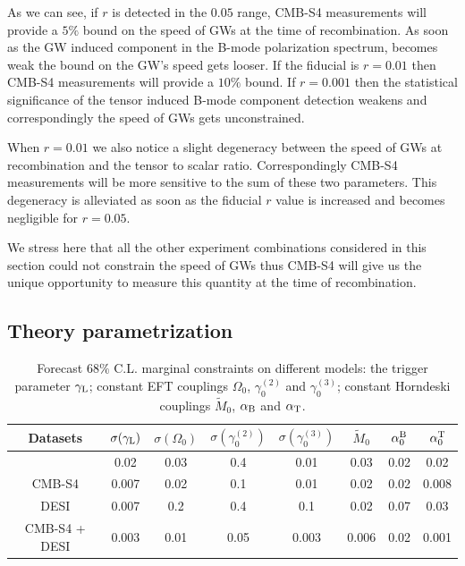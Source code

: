 As we can see, if $r$ is detected in the $0.05$ range, CMB-S4 measurements will provide a $5\%$ bound on the speed of GWs at the time of recombination.
As soon as the GW induced component in the B-mode polarization spectrum, becomes weak the bound on the GW's speed gets looser. If the fiducial is $r=0.01$ then CMB-S4 measurements will provide a $10\%$ bound. If $r=0.001$ then the statistical significance of the tensor induced B-mode component detection weakens and correspondingly the speed of GWs gets unconstrained.

When $r=0.01$ we also notice a slight degeneracy between the speed of GWs at recombination and the tensor to scalar ratio. Correspondingly CMB-S4 measurements will be more sensitive to the sum of these two parameters. This degeneracy is alleviated as soon as the fiducial $r$ value is increased and becomes negligible for $r=0.05$.

We stress here that all the other experiment combinations considered in this section could not constrain the speed of GWs thus CMB-S4 will give us the unique opportunity to measure this quantity at the time of recombination.

\subsection{Theory parametrization}

\begin{table}[t!]
\begin{center}
\begin{tabular}{|c||c||c|c|c||c|c|c|} 
\hline
Datasets 			& $\sigma ( \gamma_{\rm L} )$  & $\sigma ( \Omega_0 )$ & $\sigma ( \gamma_0^{(2)} )$ & $\sigma ( \gamma_0^{(3)} ) $ & $\tilde{M}_0$ & $\alpha_0^{\rm B}$ & $\alpha_0^{\rm T}$    \\
\hline
\hline
\planck  		& 0.02 & 0.03 & 0.4 & 0.01 & 0.03 & 0.02 & 0.02 \\
\hline
CMB-S4       & 0.007 & 0.02 & 0.1 & 0.01 & 0.02 & 0.02 & 0.008 \\
\hline
DESI            & 0.007 & 0.2 & 0.4 & 0.1 & 0.02 & 0.07 & 0.03 \\
\hline
CMB-S4 + DESI  & 0.003 & 0.01 & 0.05 & 0.003 & 0.006 & 0.02 & 0.001 \\
\hline
\end{tabular}
\caption{Forecast $68\%$ C.L. marginal constraints on different models: the trigger parameter $\gamma_{\rm L}$; constant EFT couplings $\Omega_0$, $\gamma_0^{(2)}$ and $\gamma_0^{(3)}$; constant Horndeski couplings $\tilde{M}_0$, $\alpha_{\rm B}$ and $\alpha_{\rm T}$.}
\label{table:ForecastGammaConstEFT}
\end{center}
\end{table}

